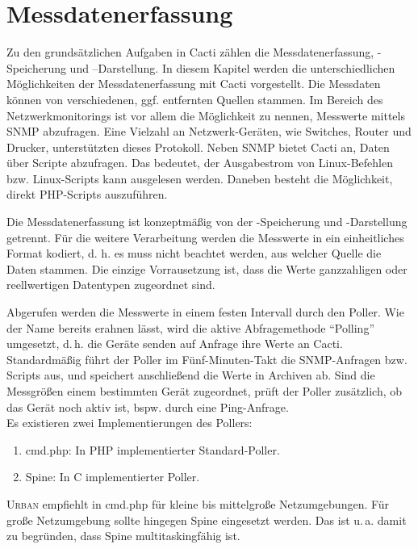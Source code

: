 \documentclass[12pt,ngerman,toc=listofnumbered,toc=bibliographynumbered,toc=index,headsepline=true]{scrbook}
\begin{document}
\chapter{Messdatenerfassung}
Zu den grundsätzlichen Aufgaben in Cacti zählen die Messdatenerfassung,
-Speicherung und –Darstellung. In diesem Kapitel werden die unterschiedlichen
Möglichkeiten der Messdatenerfassung mit Cacti vorgestellt. Die Messdaten können
von verschiedenen, ggf. entfernten Quellen stammen. Im Bereich des
Netzwerkmonitorings ist vor allem die Möglichkeit zu nennen,  Messwerte
mittels SNMP abzufragen. Eine Vielzahl an Netzwerk-Geräten, wie Switches, 
Router und Drucker, unterstützten dieses Protokoll. Neben SNMP bietet Cacti an,
Daten über Scripte abzufragen. Das bedeutet, der Ausgabestrom von Linux-Befehlen
bzw. Linux-Scripts kann ausgelesen werden. Daneben besteht die Möglichkeit,
direkt PHP-Scripts auszuführen.

Die Messdatenerfassung ist konzeptmäßig von der -Speicherung und
-Dar\-stel\-lung getrennt. Für die weitere Verarbeitung werden die Messwerte in
ein einheitliches Format kodiert, d. h. es muss nicht beachtet werden, aus
welcher Quelle die Daten stammen. Die einzige Vorrausetzung ist, dass die Werte
ganzzahligen oder reellwertigen Datentypen zugeordnet sind.

Abgerufen werden die Messwerte in einem festen Intervall durch den Poller. Wie
der Name bereits erahnen lässt, wird die aktive Abfragemethode \enquote{Polling}
umgesetzt, d.\,h. die Geräte senden auf Anfrage ihre Werte an Cacti. Standardmäßig
führt der Poller im Fünf-Minuten-Takt die SNMP-Anfragen bzw.
Scripts aus, und speichert anschließend die Werte in Archiven ab. Sind die
Messgrößen einem bestimmten Gerät zugeordnet, prüft der Poller zusätzlich, ob
das Gerät noch aktiv ist, bspw. durch eine Ping-Anfrage.\\
Es existieren zwei Implementierungen des Pollers:
\begin{enumerate}
  \item cmd.php: In PHP implementierter Standard-Poller.
  \item Spine: In C implementierter Poller.
\end{enumerate}
\textsc{Urban} empfiehlt in \cite{Urban11} cmd.php für kleine bis mittelgroße
Netzumgebungen. Für große Netzumgebung sollte hingegen Spine eingesetzt werden.
Das ist u.\,a. damit zu begründen, dass Spine multitaskingfähig ist.
\end{document}
